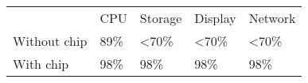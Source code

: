 \begin{table}[]
    \begin{tabular}{lllll}
        \textit{}    & CPU  & Storage         & Display         & Network         \\
        Without chip & 89\% & \textless{}70\% & \textless{}70\% & \textless{}70\% \\
        With chip    & 98\% & 98\%            & 98\%            & 98\%           
    \end{tabular}
    \label{tab:E3Table}
\end{table}